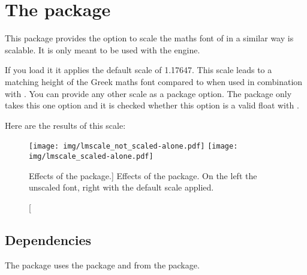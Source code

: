 \chapter{The  package}\label{sec:lmscale}
This package provides the option to scale the maths font of  in a
similar way  is scalable. It is only meant to be used with the
 engine.

If you load it it applies the default scale of \num{1.17647}. This scale leads
to a matching height of the Greek maths font compared to  when used
in combination with . You can provide any other scale as a
package option. The package only takes this one option and it is checked whether
this option is a valid float with .

Here are the results of this scale:

\begin{figure}[htb]%
  \centering
  \texttt{[image: img/lmscale\_not\_scaled-alone.pdf]}%
  \hfil
  \texttt{[image: img/lmscale\_scaled-alone.pdf]}%
  \caption
    [Effects of the  package.]
    {%
      Effects of the  package. On the left the unscaled font,
      right with the default scale applied.%
      \label{fig:lmscale}%
    }%
\end{figure}%

\section{Dependencies}\label{sec:lmscale:dep}%
The package uses the  package and  from the
 package.

